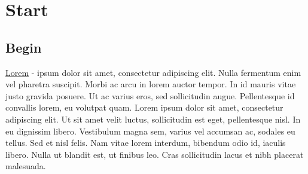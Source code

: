 \documentclass[10pt, onecolumn]{book}
\begin{document}
	
	\chapter{Start}
	\section{Begin}
	
	\underline{Lorem} - ipsum dolor sit amet, consectetur adipiscing elit. Nulla fermentum enim vel pharetra suscipit. Morbi ac arcu in lorem auctor tempor. In id mauris vitae justo gravida posuere. Ut ac varius eros, sed sollicitudin augue. Pellentesque id convallis lorem, eu volutpat quam. Lorem ipsum dolor sit amet, consectetur adipiscing elit. Ut sit amet velit luctus, sollicitudin est eget, pellentesque nisl. In eu dignissim libero. Vestibulum magna sem, varius vel accumsan ac, sodales eu tellus. Sed et nisl felis. Nam vitae lorem interdum, bibendum odio id, iaculis libero. Nulla ut blandit est, ut finibus leo. Cras sollicitudin lacus et nibh placerat malesuada.
	
\end{document}
